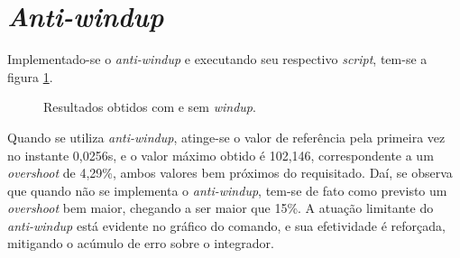 \documentclass{article}[twocolumn]
\begin{document}
	\section{\textit{Anti-windup}}
	Implementado-se o \textit{anti-windup} e executando seu respectivo \textit{script},
	tem-se a figura \ref{fig:anti_windup}.
	\begin{figure}[H]
		\centering
		\caption{Resultados obtidos com e sem \textit{windup}.}
		\label{fig:anti_windup}
	\end{figure}
	Quando se utiliza \textit{anti-windup}, atinge-se o valor de refer\^encia pela primeira vez
	no instante 0,0256s, e o valor m\'aximo obtido \'e 102,146, correspondente a um
	\textit{overshoot} de 4,29\%, ambos valores bem pr\'oximos do requisitado. Da\'i,
	se observa que quando n\~ao se implementa o \textit{anti-windup}, tem-se de fato como
	previsto um \textit{overshoot} bem maior, chegando a ser maior que 15\%. A atua\c{c}\~ao
	limitante do \textit{anti-windup} est\'a evidente no gr\'afico do comando, e sua efetividade
	\'e refor\c{c}ada, mitigando o ac\'umulo de erro sobre o integrador.
\end{document}
